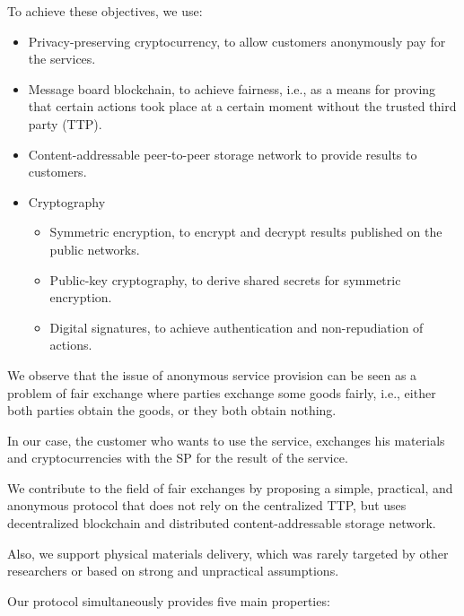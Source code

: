 \documentclass{ieeeaccess}
\begin{document}
To achieve these objectives, we use:
\begin{itemize}
    \item Privacy-preserving cryptocurrency, to allow customers anonymously pay for the services.
    \item Message board blockchain, to achieve fairness, i.e., as a means for proving that certain actions took place at a certain moment without the trusted third party (TTP).
    \item Content-addressable peer-to-peer storage network to provide results to customers. 
    \item Cryptography
    \begin{itemize}
        \item Symmetric encryption, to encrypt and decrypt results published on the public networks.
        \item Public-key cryptography, to derive shared secrets for symmetric encryption.
        \item Digital signatures, to achieve authentication and non-repudiation of actions. 
    \end{itemize}
    
\end{itemize}

We observe that the issue of anonymous service provision can be seen as a problem of fair exchange where parties exchange some goods fairly, i.e., either both parties obtain the goods, or they both obtain nothing.

In our case, the customer who wants to use the service, exchanges his materials and cryptocurrencies with the SP for the result of the service.

We contribute to the field of fair exchanges by proposing a simple, practical, and anonymous protocol that does not rely on the centralized TTP, but uses decentralized blockchain and
distributed content-addressable storage network.

Also, we support physical materials delivery, which was rarely targeted by other researchers or based on strong and unpractical assumptions.

Our protocol simultaneously provides five main properties:
\end{document}
